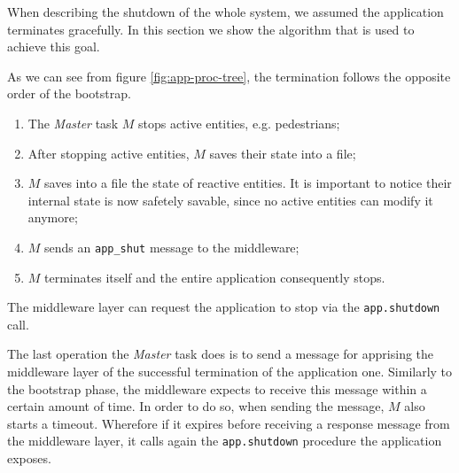 When describing the shutdown of the whole system, we assumed 
the application terminates gracefully.
In this section we show the algorithm that is used to achieve this goal.

As we can see from figure \ref{fig:app-proc-tree}, the termination follows the
opposite order of the bootstrap.

\begin{enumerate}
  \item The \textit{Master} task $M$ stops active entities, e.g. pedestrians;
  \item After stopping active entities, $M$ saves their state into a file;
  \item $M$ saves into a file the state of reactive entities. 
  It is important to notice their internal state is now safetely savable, 
  since no active entities can modify it anymore;
  \item $M$ sends an \texttt{app\_shut} message to the middleware;
  \item $M$ terminates itself and the entire application consequently stops.
\end{enumerate}

The middleware layer can request the application to stop via the
\texttt{app.shutdown} call.

The last operation the \textit{Master} task does is to send a message for apprising
the middleware layer of the successful termination of the application one.
Similarly to the bootstrap phase, the middleware expects to receive this
message within a certain amount of time. 
In order to do so, when sending the message, $M$ also starts a timeout.
Wherefore if it expires before receiving a response message from the middleware layer, 
it calls again the \texttt{app.shutdown} procedure the application exposes.
